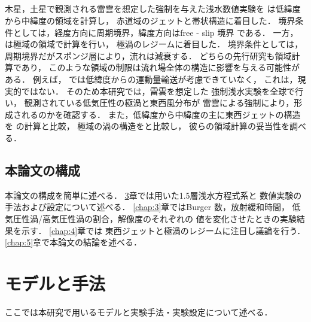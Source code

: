 \documentclass[a4j,12pt,openbib,oneside]{jreport}
\begin{document}
\section{}
\label{sec:intro3}
木星，土星で観測される雷雲を想定した強制を与えた浅水数値実験を
\cite{Showman2007}は低緯度から中緯度の領域を計算し，
赤道域のジェットと帯状構造に着目した．
境界条件としては，経度方向に周期境界，緯度方向はfree - slip 境界 である．
%
一方，\cite{Brueshaber2019}は極域の領域で計算を行い，
極渦のレジームに着目した．
境界条件としては，周期境界だがスポンジ層により，流れは減衰する．
%
どちらの先行研究も領域計算であり，
このような領域の制限は流れ場全体の構造に影響を与える可能性がある．
例えば，\cite{Brueshaber2019} では低緯度からの運動量輸送が考慮できていなく，
これは，現実的ではない．
%
%
%
そのため本研究では，雷雲を想定した
強制浅水実験を全球で行い，
観測されている低気圧性の極渦と東西風分布が
雷雲による強制により，形成されるのかを確認する．
%
また，低緯度から中緯度の主に東西ジェットの構造を
\cite{Showman2007}の計算と比較，
極域の渦の構造を\cite{Brueshaber2019}と比較し，
彼らの領域計算の妥当性を調べる．
%
\def\intro4{本論文の構成}
\section{\intro4}
\label{sec:intro4}
本論文の構成を簡単に述べる．
\ref{chap:2}章では用いた1.5層浅水方程式系と
数値実験の手法および設定について述べる．
\ref{chap:3}章ではBurger 数，放射緩和時間，
低気圧性渦/高気圧性渦の割合，解像度のそれぞれの
値を変化させたときの実験結果を示す．
\ref{chap:4}章では
東西ジェットと極渦のレジームに注目し議論を行う．
\ref{chap:5}章で本論文の結論を述べる．
%
%
\setcounter{table}{0}
\def\chap2{モデルと手法}
\chapter{\chap2}
\label{chap:2}
\markright{2 \chap2}
ここでは本研究で用いるモデルと実験手法・実験設定について述べる．
\end{document}
